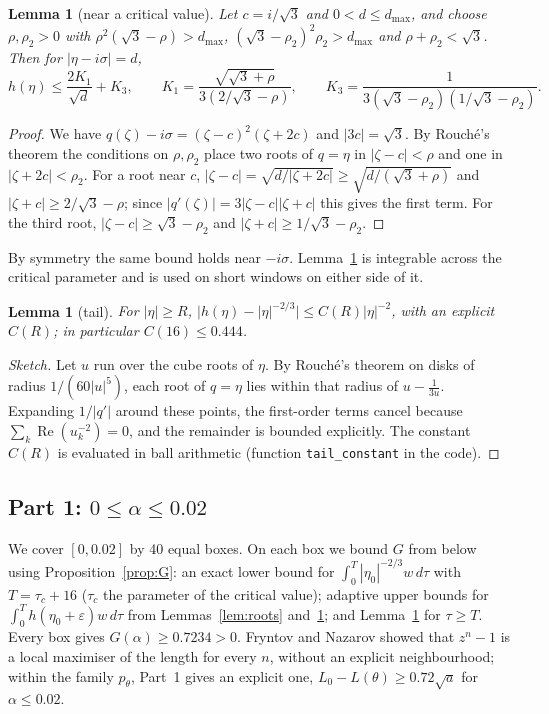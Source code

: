 \documentclass[11pt]{amsart}
\newtheorem{lemma}[theorem]{Lemma}
\theoremstyle{remark}
\begin{document}
\begin{lemma}[near a critical value]\label{lem:crit}
Let $c=i/\sqrt3$ and $0<d\le d_{\max}$, and choose $\rho,\rho_2>0$ with $\rho^2(\sqrt3-\rho)>d_{\max}$, $(\sqrt3-\rho_2)^2\rho_2>d_{\max}$ and $\rho+\rho_2<\sqrt3$. Then for $|\eta-i\sigma|=d$,
\[
h(\eta)\le\frac{2K_1}{\sqrt d}+K_3,\qquad K_1=\frac{\sqrt{\sqrt3+\rho}}{3(2/\sqrt3-\rho)},\qquad K_3=\frac{1}{3(\sqrt3-\rho_2)(1/\sqrt3-\rho_2)}.
\]
\end{lemma}

\begin{proof}
We have $q(\zeta)-i\sigma=(\zeta-c)^2(\zeta+2c)$ and $|3c|=\sqrt3$. By Rouch\'e's theorem the conditions on $\rho,\rho_2$ place two roots of $q=\eta$ in $|\zeta-c|<\rho$ and one in $|\zeta+2c|<\rho_2$. For a root near $c$, $|\zeta-c|=\sqrt{d/|\zeta+2c|}\ge\sqrt{d/(\sqrt3+\rho)}$ and $|\zeta+c|\ge 2/\sqrt3-\rho$; since $|q'(\zeta)|=3|\zeta-c||\zeta+c|$ this gives the first term. For the third root, $|\zeta-c|\ge\sqrt3-\rho_2$ and $|\zeta+c|\ge1/\sqrt3-\rho_2$.
\end{proof}

By symmetry the same bound holds near $-i\sigma$. Lemma~\ref{lem:crit} is integrable across the critical parameter and is used on short windows on either side of it.

\begin{lemma}[tail]\label{lem:tail}
For $|\eta|\ge R$, $\bigl|h(\eta)-|\eta|^{-2/3}\bigr|\le C(R)|\eta|^{-2}$, with an explicit $C(R)$; in particular $C(16)\le0.444$.
\end{lemma}

\begin{proof}[Sketch]
Let $u$ run over the cube roots of $\eta$. By Rouch\'e's theorem on disks of radius $1/(60|u|^5)$, each root of $q=\eta$ lies within that radius of $u-\tfrac1{3u}$. Expanding $1/|q'|$ around these points, the first-order terms cancel because $\sum_k\operatorname{Re}(u_k^{-2})=0$, and the remainder is bounded explicitly. The constant $C(R)$ is evaluated in ball arithmetic (function \texttt{tail\_constant} in the code).
\end{proof}

\subsection*{Part 1: $0\le\alpha\le0.02$}
We cover $[0,0.02]$ by 40 equal boxes. On each box we bound $G$ from below using Proposition~\ref{prop:G}: an exact lower bound for $\int_0^{T}|\eta_0|^{-2/3}w\,d\tau$ with $T=\tau_c+16$ ($\tau_c$ the parameter of the critical value); adaptive upper bounds for $\int_0^T h(\eta_0+\varepsilon)w\,d\tau$ from Lemmas~\ref{lem:roots} and~\ref{lem:crit}; and Lemma~\ref{lem:tail} for $\tau\ge T$. Every box gives $G(\alpha)\ge0.7234>0$. Fryntov and Nazarov \cite{FN} showed that $z^n-1$ is a local maximiser of the length for every $n$, without an explicit neighbourhood; within the family $p_\theta$, Part~1 gives an explicit one, $L_0-L(\theta)\ge 0.72\sqrt a$ for $\alpha\le0.02$.
\end{document}
